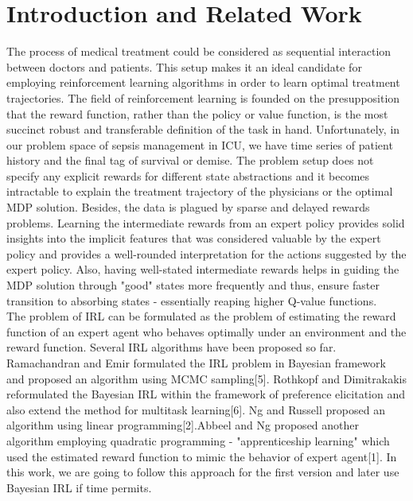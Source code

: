 \documentclass[twoside,11pt]{article}
\begin{document}
\section{Introduction and Related Work}
The process of medical treatment could be considered as sequential interaction between doctors and patients. This setup makes it an ideal candidate for employing reinforcement learning algorithms in order to learn optimal treatment trajectories. The field of reinforcement learning is founded on the presupposition that the reward function, rather than the policy or value function, is the most succinct robust and transferable definition of the task in hand. Unfortunately, in our problem space of sepsis management in ICU, we have time series of patient history and the final tag of survival or demise. The problem setup does not specify any explicit rewards for different state abstractions and it becomes intractable to explain the treatment trajectory of the physicians or the optimal MDP solution. Besides, the data is plagued by sparse and delayed rewards problems. Learning the intermediate rewards from an expert policy provides solid insights into the implicit features that was considered valuable by the expert policy and provides a well-rounded interpretation for the actions suggested by the expert policy. Also, having well-stated intermediate rewards helps in guiding the MDP solution through "good" states more frequently and thus, ensure faster transition to absorbing states - essentially reaping higher Q-value functions.\\[10pt]
The problem of IRL can be formulated as the problem of estimating the reward function of an expert agent who behaves optimally under an environment and the reward function. Several IRL algorithms have been proposed so far. Ramachandran and Emir formulated the IRL problem in Bayesian framework and proposed an algorithm using MCMC sampling[5]. Rothkopf and Dimitrakakis reformulated the Bayesian IRL within the framework of preference elicitation and also extend the method for multitask learning[6]. Ng and Russell proposed an algorithm using linear programming[2].Abbeel and Ng proposed another algorithm employing quadratic programming - "apprenticeship learning" which used the estimated reward function to mimic the behavior of expert agent[1]. In this work, we are going to follow this approach for the first version and later use Bayesian IRL if time permits.
\end{document}
